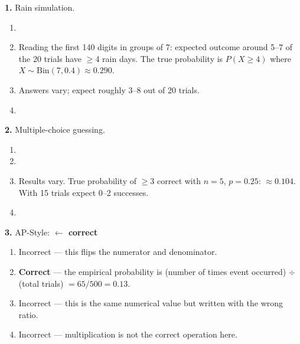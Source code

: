 \documentclass[10pt]{article}
\begin{document}
\namedateperiod

\vspace{0.1in}

\begin{practicebox}
\small

\textbf{1.} Rain simulation.
\begin{enumerate}[label=(\alph*), leftmargin=2em, itemsep=5pt]
  \item {}
  \item \begin{teachernote}
    Reading the first 140 digits in groups of 7: expected outcome around 5--7 of the 20 trials have $\geq$4 rain days. The true probability is $P(X \geq 4)$ where $X \sim \text{Bin}(7, 0.4) \approx 0.290$.
  \end{teachernote}
  \item \begin{teachernote}Answers vary; expect roughly 3--8 out of 20 trials.\end{teachernote}
  \item {}
\end{enumerate}

\vspace{6pt}
\textbf{2.} Multiple-choice guessing.
\begin{enumerate}[label=(\alph*), leftmargin=2em, itemsep=5pt]
  \item {}
  \item {}
  \item \begin{teachernote}Results vary. True probability of $\geq 3$ correct with $n=5$, $p=0.25$: $\approx 0.104$. With 15 trials expect 0--2 successes.\end{teachernote}
  \item {}
\end{enumerate}

\vspace{6pt}
\textbf{3.} AP-Style:  \textcolor{keyred}{\textbf{$\leftarrow$ correct}}
\begin{enumerate}[label=(\Alph*), leftmargin=2em, itemsep=2pt]
  \item Incorrect --- this flips the numerator and denominator.
  \item \textbf{Correct} --- the empirical probability is (number of times event occurred) $\div$ (total trials) $= 65/500 = 0.13$.
  \item Incorrect --- this is the same numerical value but written with the wrong ratio.
  \item Incorrect --- multiplication is not the correct operation here.
\end{enumerate}


\end{practicebox}
\end{document}
